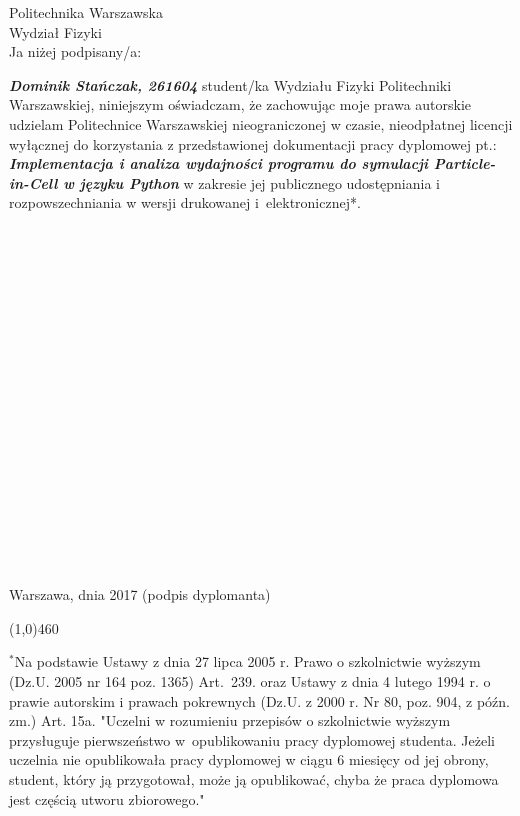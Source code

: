 \setcounter{page}{9}
\vspace{-1.5cm}
\begin{flushleft}
	Politechnika Warszawska \\
	Wydział Fizyki \\
	\vspace{0.5cm}
	Ja niżej podpisany/a:
\end{flushleft}
\center \textit{\textbf{Dominik Stańczak, 261604}} %
\justify student/ka Wydziału Fizyki Politechniki Warszawskiej, niniejszym oświadczam, że zachowując moje prawa autorskie udzielam Politechnice Warszawskiej nieograniczonej w czasie, nieodpłatnej licencji wyłącznej do korzystania z przedstawionej dokumentacji pracy dyplomowej pt.:
\center \textit{\textbf{Implementacja i analiza wydajności programu do symulacji Particle-in-Cell w języku Python}} %
\justify w zakresie jej publicznego udostępniania i rozpowszechniania w wersji drukowanej i~elektronicznej*.
\\~\\~\\~\\~\\~\\~\\~\\~\\~\\~\\~\\~\\~\\~\\~\\~\\~\\~\\~\\
Warszawa, dnia 2017 \hfill (podpis dyplomanta) %

\begin{center}
	\color{plum}
	\line(1,0){460}
\end{center}
\footnotesize \noindent $^{*}$Na podstawie Ustawy z dnia 27 lipca 2005 r. Prawo o szkolnictwie wyższym (Dz.U. 2005 nr 164 poz. 1365) Art.~239. oraz Ustawy z dnia 4 lutego 1994 r. o prawie autorskim i prawach pokrewnych (Dz.U. z 2000 r. Nr 80, poz. 904, z późn. zm.) Art. 15a. "Uczelni w rozumieniu przepisów o szkolnictwie wyższym przysługuje pierwszeństwo w~opublikowaniu pracy dyplomowej studenta. Jeżeli uczelnia nie opublikowała pracy dyplomowej w ciągu 6 miesięcy od jej obrony, student, który ją przygotował, może ją opublikować, chyba że praca dyplomowa jest częścią utworu zbiorowego."

\newpage
\thispagestyle{empty}
\phantom{Nothing here}


